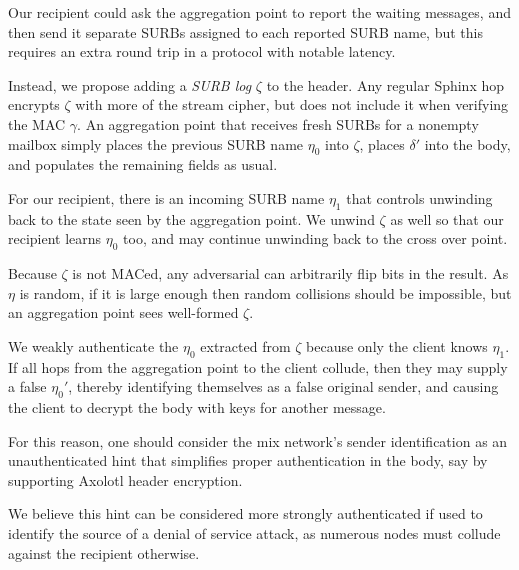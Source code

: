 \documentclass[twoside,letterpaper]{llncs}
\begin{document}
Our recipient could ask the aggregation point to report the waiting
messages, and then send it separate SURBs assigned to each reported
SURB name, but this requires an extra round trip in a protocol with
notable latency. 

Instead, we propose adding a {\it SURB log} $\zeta$ to the header.
Any regular Sphinx hop encrypts $\zeta$ with more of the stream
cipher, but does not include it when verifying the MAC $\gamma$.
An aggregation point that receives fresh SURBs for a nonempty
mailbox simply places the previous SURB name $\eta_0$ into $\zeta$,
places $\delta'$ into the body, and populates the remaining fields
as usual.

For our recipient, there is an incoming SURB name $\eta_1$ that 
controls unwinding back to the state seen by the aggregation point.
We unwind $\zeta$ as well so that our recipient learns $\eta_0$ too,
and may continue unwinding back to the cross over point.

Because $\zeta$ is not MACed, any adversarial can arbitrarily flip
bits in the result.  As $\eta$ is random, if it is large enough then
random collisions should be impossible, but an aggregation point sees
well-formed $\zeta$.

We weakly authenticate the $\eta_0$ extracted from $\zeta$ because
only the client knows $\eta_1$.  If all hops from the aggregation
point to the client collude, then they may supply a false $\eta_0'$,
thereby identifying themselves as a false original sender, and
causing the client to decrypt the body with keys for another message.

For this reason, one should consider the mix network's sender identification
as an unauthenticated hint that simplifies proper authentication in
the body, say by supporting Axolotl header encryption.

We believe this hint can be considered more strongly authenticated
if used to identify the source of a denial of service attack, as
numerous nodes must collude against the recipient otherwise.
\end{document}
